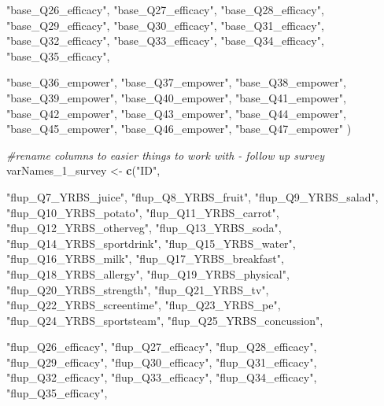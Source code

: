 \documentclass[]{article}
\newenvironment{Shaded}{\begin{snugshade}}{\end{snugshade}}
\newcommand{\KeywordTok}[1]{\textcolor[rgb]{0.13,0.29,0.53}{\textbf{#1}}}
\newcommand{\StringTok}[1]{\textcolor[rgb]{0.31,0.60,0.02}{#1}}
\newcommand{\CommentTok}[1]{\textcolor[rgb]{0.56,0.35,0.01}{\textit{#1}}}
\newcommand{\NormalTok}[1]{#1}
\begin{document}
\begin{Shaded}
\begin{Highlighting}[]
  \StringTok{"base_Q26_efficacy"}\NormalTok{, }\StringTok{"base_Q27_efficacy"}\NormalTok{, }\StringTok{"base_Q28_efficacy"}\NormalTok{,}
  \StringTok{"base_Q29_efficacy"}\NormalTok{, }\StringTok{"base_Q30_efficacy"}\NormalTok{, }\StringTok{"base_Q31_efficacy"}\NormalTok{, }
  \StringTok{"base_Q32_efficacy"}\NormalTok{, }\StringTok{"base_Q33_efficacy"}\NormalTok{, }\StringTok{"base_Q34_efficacy"}\NormalTok{, }
  \StringTok{"base_Q35_efficacy"}\NormalTok{, }
 
  \StringTok{"base_Q36_empower"}\NormalTok{, }\StringTok{"base_Q37_empower"}\NormalTok{, }\StringTok{"base_Q38_empower"}\NormalTok{,}
  \StringTok{"base_Q39_empower"}\NormalTok{, }\StringTok{"base_Q40_empower"}\NormalTok{, }\StringTok{"base_Q41_empower"}\NormalTok{,}
  \StringTok{"base_Q42_empower"}\NormalTok{, }\StringTok{"base_Q43_empower"}\NormalTok{, }\StringTok{"base_Q44_empower"}\NormalTok{,}
  \StringTok{"base_Q45_empower"}\NormalTok{, }\StringTok{"base_Q46_empower"}\NormalTok{, }\StringTok{"base_Q47_empower"}
\NormalTok{)}

\CommentTok{#rename columns to easier things to work with - follow up survey}
\NormalTok{varNames_1_survey <-}\StringTok{ }\KeywordTok{c}\NormalTok{(}\StringTok{"ID"}\NormalTok{, }

 \StringTok{"flup_Q7_YRBS_juice"}\NormalTok{, }\StringTok{"flup_Q8_YRBS_fruit"}\NormalTok{, }\StringTok{"flup_Q9_YRBS_salad"}\NormalTok{,}
 \StringTok{"flup_Q10_YRBS_potato"}\NormalTok{, }\StringTok{"flup_Q11_YRBS_carrot"}\NormalTok{, }\StringTok{"flup_Q12_YRBS_otherveg"}\NormalTok{, }
 \StringTok{"flup_Q13_YRBS_soda"}\NormalTok{, }\StringTok{"flup_Q14_YRBS_sportdrink"}\NormalTok{, }\StringTok{"flup_Q15_YRBS_water"}\NormalTok{, }
 \StringTok{"flup_Q16_YRBS_milk"}\NormalTok{, }\StringTok{"flup_Q17_YRBS_breakfast"}\NormalTok{, }\StringTok{"flup_Q18_YRBS_allergy"}\NormalTok{,}
 \StringTok{"flup_Q19_YRBS_physical"}\NormalTok{, }\StringTok{"flup_Q20_YRBS_strength"}\NormalTok{, }\StringTok{"flup_Q21_YRBS_tv"}\NormalTok{,}
 \StringTok{"flup_Q22_YRBS_screentime"}\NormalTok{, }\StringTok{"flup_Q23_YRBS_pe"}\NormalTok{, }\StringTok{"flup_Q24_YRBS_sportsteam"}\NormalTok{, }
 \StringTok{"flup_Q25_YRBS_concussion"}\NormalTok{, }
 
  \StringTok{"flup_Q26_efficacy"}\NormalTok{, }\StringTok{"flup_Q27_efficacy"}\NormalTok{, }\StringTok{"flup_Q28_efficacy"}\NormalTok{,}
  \StringTok{"flup_Q29_efficacy"}\NormalTok{, }\StringTok{"flup_Q30_efficacy"}\NormalTok{, }\StringTok{"flup_Q31_efficacy"}\NormalTok{, }
  \StringTok{"flup_Q32_efficacy"}\NormalTok{, }\StringTok{"flup_Q33_efficacy"}\NormalTok{, }\StringTok{"flup_Q34_efficacy"}\NormalTok{, }
  \StringTok{"flup_Q35_efficacy"}\NormalTok{, }
 

\end{Highlighting}
\end{Shaded}
\end{document}
